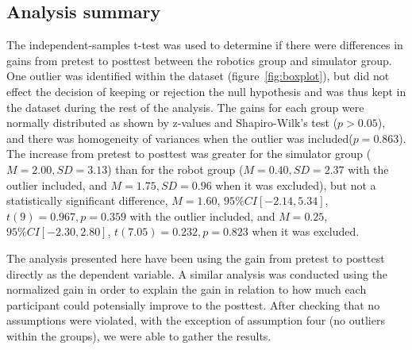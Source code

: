 \subsection*{Analysis summary}
The independent-samples t-test was used to determine if there were differences in gains from pretest to posttest between the robotics group and simulator group. One outlier was identified within the dataset (figure~\ref{fig:boxplot}), but did not effect the decision of keeping or rejection the null hypothesis and was thus kept in the dataset during the rest of the analysis. 
The gains for each group were normally distributed as shown by z-values and Shapiro-Wilk's test ($p > 0.05$), and there was homogeneity of variances when the outlier was included($p = 0.863$). The increase from pretest to posttest was greater for the simulator group ($M = 2.00, SD = 3.13$) than for the robot group ($M = 0.40, SD = 2.37$ with the outlier included, and $M=1.75, SD = 0.96$ when it was excluded), but not a statistically significant difference, $M = 1.60$, $95\% CI [-2.14, 5.34]$, $t(9) = 0.967, p = 0.359$ with the outlier included, and $M = 0.25$, $95\% CI [-2.30, 2.80]$, $t(7.05) = 0.232, p = 0.823$ when it was excluded.

\bigskip\noindent
The analysis presented here have been using the gain from pretest to posttest directly as the dependent variable. A similar analysis was conducted using the normalized gain in order to explain the gain in relation to how much each participant could potensially improve to the posttest. After checking that no assumptions were violated, with the exception of assumption four (no outliers within the groups), we were able to gather the results. 

